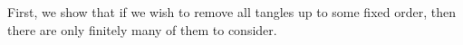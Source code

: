 \documentclass{memo-l}
\theoremstyle{plain}
\theoremstyle{definition}
\numberwithin{section}{chapter}
\numberwithin{equation}{chapter}
\newcommand{\rhoroot}[1]{\rho^{1/2}(H_{#1})}
\DeclareMathOperator{\HasTangle}{HasTangle}
\DeclareMathOperator{\ord}{ord}
\DeclareMathOperator{\Tangle}{Tangle}
\DeclareMathOperator{\Occurs}{Occurs}
\theoremstyle{plain}
\theoremstyle{definition}
\newtheorem{defn}[theorem]{Definition}
\newcommand\cC{\mathcal{C}}
\begin{document}


First, we show that if we wish to remove all tangles up to 
some fixed order, then there are only finitely many of them to consider.
\end{document}
